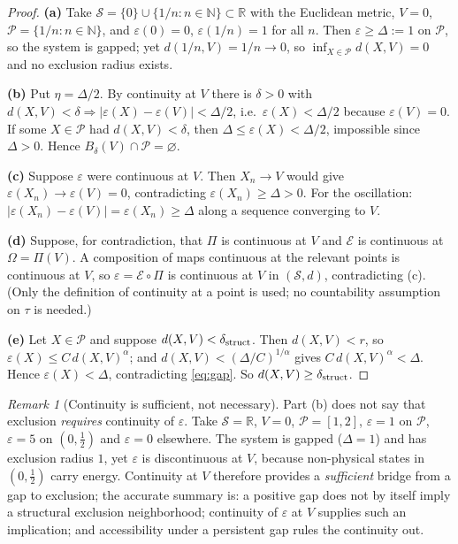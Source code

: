 \documentclass[11pt,a4paper]{article}
\theoremstyle{definition}
\theoremstyle{remark}
\newtheorem{remark}{Remark}
\newcommand{\Pset}{\mathcal{P}}
\begin{document}
\begin{proof}
\textbf{(a)} Take $\mathcal S=\{0\}\cup\{1/n:n\in\mathbb N\}\subset\mathbb R$ with the Euclidean metric, $V=0$, $\Pset=\{1/n:n\in\mathbb N\}$, and $\varepsilon(0)=0$, $\varepsilon(1/n)=1$ for all $n$. Then $\varepsilon\ge\Delta:=1$ on $\Pset$, so the system is gapped; yet $d(1/n,V)=1/n\to0$, so $\inf_{X\in\Pset}d(X,V)=0$ and no exclusion radius exists.

\textbf{(b)} Put $\eta=\Delta/2$. By continuity at $V$ there is $\delta>0$ with $d(X,V)<\delta\Rightarrow|\varepsilon(X)-\varepsilon(V)|<\Delta/2$, i.e.\ $\varepsilon(X)<\Delta/2$ because $\varepsilon(V)=0$. If some $X\in\Pset$ had $d(X,V)<\delta$, then $\Delta\le\varepsilon(X)<\Delta/2$, impossible since $\Delta>0$. Hence $B_\delta(V)\cap\Pset=\varnothing$.

\textbf{(c)} Suppose $\varepsilon$ were continuous at $V$. Then $X_n\to V$ would give $\varepsilon(X_n)\to\varepsilon(V)=0$, contradicting $\varepsilon(X_n)\ge\Delta>0$. For the oscillation: $|\varepsilon(X_n)-\varepsilon(V)|=\varepsilon(X_n)\ge\Delta$ along a sequence converging to $V$.

\textbf{(d)} Suppose, for contradiction, that $\Pi$ is continuous at $V$ and $\mathcal E$ is continuous at $\Omega=\Pi(V)$. A composition of maps continuous at the relevant points is continuous at $V$, so $\varepsilon=\mathcal E\circ\Pi$ is continuous at $V$ in $(\mathcal S,d)$, contradicting (c). (Only the definition of continuity at a point is used; no countability assumption on $\tau$ is needed.)

\textbf{(e)} Let $X\in\Pset$ and suppose $d(X,V)<\delta_{\rm struct}$. Then $d(X,V)<r$, so $\varepsilon(X)\le C\,d(X,V)^\alpha$; and $d(X,V)<(\Delta/C)^{1/\alpha}$ gives $C\,d(X,V)^\alpha<\Delta$. Hence $\varepsilon(X)<\Delta$, contradicting \eqref{eq:gap}. So $d(X,V)\ge\delta_{\rm struct}$.
\end{proof}

\begin{remark}[Continuity is sufficient, not necessary]\label{rem:nonnec}
Part (b) does not say that exclusion \emph{requires} continuity of $\varepsilon$. Take $\mathcal S=\mathbb R$, $V=0$, $\Pset=[1,2]$, $\varepsilon=1$ on $\Pset$, $\varepsilon=5$ on $(0,\tfrac12)$ and $\varepsilon=0$ elsewhere. The system is gapped ($\Delta=1$) and has exclusion radius $1$, yet $\varepsilon$ is discontinuous at $V$, because non-physical states in $(0,\frac12)$ carry energy. Continuity at $V$ therefore provides a \emph{sufficient} bridge from a gap to exclusion; the accurate summary is: a positive gap does not by itself imply a structural exclusion neighborhood; continuity of $\varepsilon$ at $V$ supplies such an implication; and accessibility under a persistent gap rules the continuity out.
\end{remark}
\end{document}
